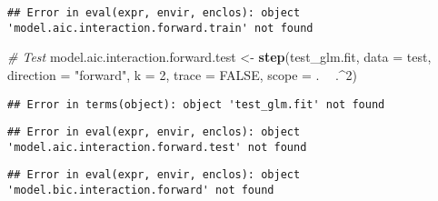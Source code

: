 \documentclass[]{article}
\newenvironment{Shaded}{\begin{snugshade}}{\end{snugshade}}
\newcommand{\CommentTok}[1]{\textcolor[rgb]{0.56,0.35,0.01}{\textit{#1}}}
\newcommand{\DataTypeTok}[1]{\textcolor[rgb]{0.13,0.29,0.53}{#1}}
\newcommand{\DecValTok}[1]{\textcolor[rgb]{0.00,0.00,0.81}{#1}}
\newcommand{\KeywordTok}[1]{\textcolor[rgb]{0.13,0.29,0.53}{\textbf{#1}}}
\newcommand{\NormalTok}[1]{#1}
\newcommand{\OperatorTok}[1]{\textcolor[rgb]{0.81,0.36,0.00}{\textbf{#1}}}
\newcommand{\OtherTok}[1]{\textcolor[rgb]{0.56,0.35,0.01}{#1}}
\newcommand{\StringTok}[1]{\textcolor[rgb]{0.31,0.60,0.02}{#1}}
\begin{document}
\begin{verbatim}
## Error in eval(expr, envir, enclos): object 'model.aic.interaction.forward.train' not found
\end{verbatim}

\begin{Shaded}
\begin{Highlighting}[]
\CommentTok{# Test}
\NormalTok{model.aic.interaction.forward.test <-}\StringTok{ }\KeywordTok{step}\NormalTok{(test_glm.fit, }\DataTypeTok{data =}\NormalTok{ test, }\DataTypeTok{direction =} \StringTok{"forward"}\NormalTok{, }\DataTypeTok{k =} \DecValTok{2}\NormalTok{, }\DataTypeTok{trace =} \OtherTok{FALSE}\NormalTok{,}
                                      \DataTypeTok{scope =}\NormalTok{ . }\OperatorTok{~}\StringTok{ }\NormalTok{.}\OperatorTok{^}\DecValTok{2}\NormalTok{)}
\end{Highlighting}
\end{Shaded}

\begin{verbatim}
## Error in terms(object): object 'test_glm.fit' not found
\end{verbatim}

\begin{Shaded}
\end{Shaded}

\begin{verbatim}
## Error in eval(expr, envir, enclos): object 'model.aic.interaction.forward.test' not found
\end{verbatim}

\begin{Shaded}
\end{Shaded}

\begin{verbatim}
## Error in eval(expr, envir, enclos): object 'model.bic.interaction.forward' not found
\end{verbatim}
\end{document}

